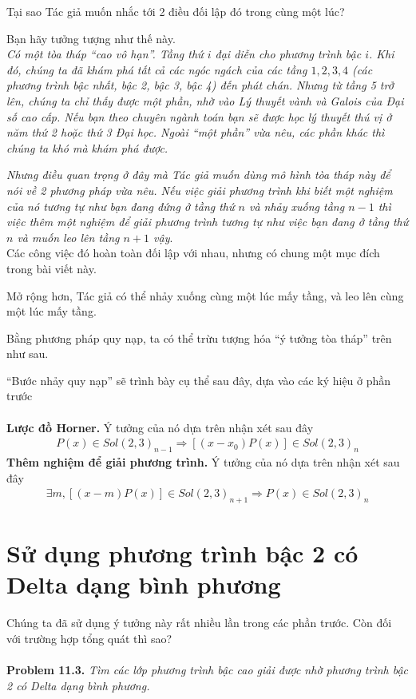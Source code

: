 \documentclass[a4paper,oneside]{book}
\numberwithin{equation}{chapter}
\begin{document}
Tại sao Tác giả muốn nhắc tới 2 điều đối lập đó trong cùng một lúc?

Bạn hãy tưởng tượng như thế này.\\

\textit{Có một tòa tháp ``cao vô hạn''. Tầng thứ $i$ đại diễn cho phương trình bậc $i$. Khi đó, chúng ta đã khám phá tất cả các ngóc ngách của các tầng $1, 2, 3, 4$ (các phương trình bậc nhất, bậc 2, bậc 3, bậc 4) đến phát chán. Nhưng từ tầng 5 trở lên, chúng ta chỉ thấy được một phần, nhờ vào Lý thuyết vành và Galois của Đại số cao cấp. Nếu bạn theo chuyên ngành toán bạn sẽ được học lý thuyết thú vị ở năm thứ 2 hoặc thứ 3 Đại học. Ngoài ``một phần'' vừa nêu, các phần khác thì chúng ta khó mà khám phá được.}

\textit{Nhưng điều quan trọng ở đây mà Tác giả muốn dùng mô hình tòa tháp này để nói về 2 phương pháp vừa nêu. Nếu việc giải phương trình khi biết một nghiệm của nó tương tự như bạn đang đứng ở tầng thứ $n$ và nhảy xuống tầng $n-1$ thì việc thêm một nghiệm để giải phương trình tương tự như việc bạn đang ở tầng thứ $n$ và muốn leo lên tầng $n+1$ vậy}.\\

Các công việc đó hoàn toàn đối lập với nhau, nhưng có chung một mục đích trong bài viết này.

Mở rộng hơn, Tác giả có thể nhảy xuống cùng một lúc mấy tầng, và leo lên cùng một lúc mấy tầng. 

Bằng phương pháp quy nạp, ta có thể trừu tượng hóa ``ý tưởng tòa tháp'' trên như sau.

``Bước nhảy quy nạp'' sẽ trình bày cụ thể sau đây, dựa vào các ký hiệu ở phần trước\\
\\
\textbf{Lược đồ Horner.} Ý tưởng của nó dựa trên nhận xét sau đây
\begin{align}
P\left( x \right) \in Sol{\left( {2,3} \right)_{n - 1}} \Rightarrow \left[ {\left( {x - {x_0}} \right)P\left( x \right)} \right] \in Sol{\left( {2,3} \right)_n}
\end{align}
\textbf{Thêm nghiệm để giải phương trình.} Ý tưởng của nó dựa trên nhận xét sau đây
\begin{align}
\exists m,\left[ {\left( {x - m} \right)P\left( x \right)} \right] \in Sol{\left( {2,3} \right)_{n + 1}} \Rightarrow P\left( x \right) \in Sol{\left( {2,3} \right)_n}
\end{align}
\section{Sử dụng phương trình bậc 2 có Delta dạng bình phương}
Chúng ta đã sử dụng ý tưởng này rất nhiều lần trong các phần trước. Còn đối với trường hợp tổng quát thì sao?\\
\\
\textbf{Problem 11.3.} \textit{Tìm các lớp phương trình bậc cao giải được nhờ phương trình bậc 2 có Delta dạng bình phương.}\\
\end{document}
